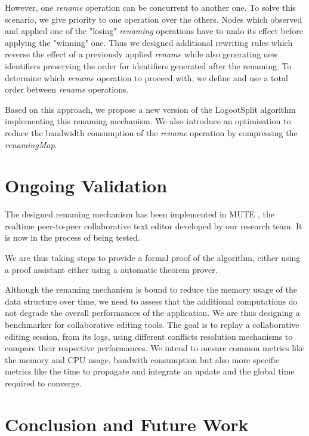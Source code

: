 \documentclass[sigplan]{acmart}
\begin{document}
However, one \emph{rename} operation can be concurrent to another one.
To solve this scenario, we give priority to one operation over the others.
Nodes which observed and applied one of the "losing" \emph{renaming} operations have to undo its effect before applying the "winning" one.
Thus we designed additional rewriting rules which reverse the effect of a previously applied \emph{rename} while also generating new identifiers preserving the order for identifiers generated after the renaming.
To determine which \emph{rename} operation to proceed with, we define and use a total order between \emph{rename} operations.

Based on this approach, we propose a new version of the LogootSplit \cite{AndreCollaborateCom2013} algorithm implementing this renaming mechanism.
We also introduce an optimisation to reduce the bandwidth consumption of the \emph{rename} operation by compressing the \emph{renamingMap}.

\section{Ongoing Validation}

The designed renaming mechanism has been implemented in MUTE \cite{nicolas:hal-01655438}, the realtime peer-to-peer collaborative text editor developed by our research team.
It is now in the process of being tested.

We are thus taking steps to provide a formal proof of the algorithm, either using a proof assistant either using a automatic theorem prover.

Although the renaming mechanism is bound to reduce the memory usage of the data structure over time, we need to assess that the additional computations do not degrade the overall performances of the application.
We are thus designing a benchmarker for collaborative editing tools.
The goal is to replay a collaborative editing session, from its logs, using different conflicts resolution mechanisms to compare their respective performances.
We intend to mesure common metrics like the memory and CPU usage, bandwith consumption but also more specific metrics like the time to propagate and integrate an update and the global time required to converge.

\section{Conclusion and Future Work}
\end{document}
